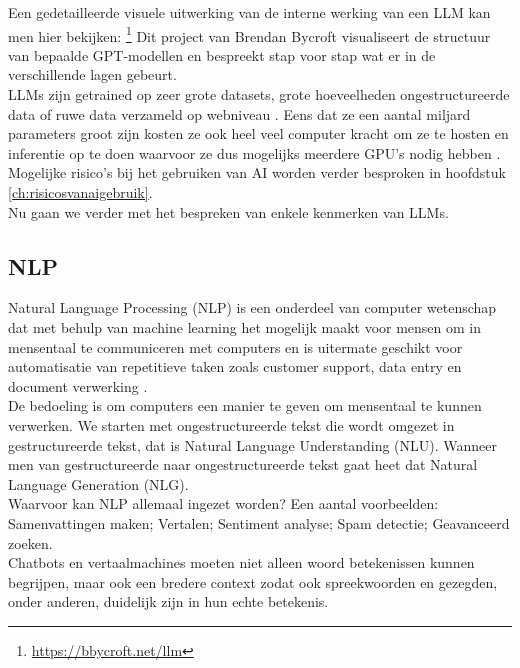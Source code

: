 Een gedetailleerde visuele uitwerking van de interne werking van een LLM kan men hier bekijken: \footnote{\href{https://bbycroft.net/llm}{https://bbycroft.net/llm}}
Dit project van Brendan Bycroft visualiseert de structuur van bepaalde GPT-modellen en bespreekt stap voor stap wat er in de verschillende lagen gebeurt. \\

LLMs zijn getrained op zeer grote datasets, grote hoeveelheden ongestructureerde data of ruwe data verzameld op webniveau \autocite{Bommasani2021}. Eens dat ze een aantal miljard parameters groot zijn kosten ze ook heel veel computer kracht om ze te hosten en inferentie op te doen waarvoor ze dus mogelijks meerdere GPU's nodig hebben \autocite{IBM2026}. Mogelijke risico's bij het gebruiken van AI worden verder besproken in hoofdstuk \ref{ch:risicosvanaigebruik}. \\

Nu gaan we verder met het bespreken van enkele kenmerken van LLMs.

\subsection{NLP}
\label{ssec:nlp}
Natural Language Processing (NLP) is een onderdeel van computer wetenschap dat met behulp van machine learning het mogelijk maakt voor mensen om in mensentaal te communiceren met computers en is uitermate geschikt voor automatisatie van repetitieve taken zoals customer support, data entry en document verwerking \autocite{IBMb}. \\

De bedoeling is om computers een manier te geven om mensentaal te kunnen verwerken. We starten met ongestructureerde tekst die wordt omgezet in gestructureerde tekst, dat is Natural Language Understanding (NLU). Wanneer men van gestructureerde naar ongestructureerde tekst gaat heet dat Natural Language Generation (NLG). \\

Waarvoor kan NLP allemaal ingezet worden? Een aantal voorbeelden: Samenvattingen maken; Vertalen; Sentiment analyse; Spam detectie; Geavanceerd zoeken. \\

Chatbots en vertaalmachines moeten niet alleen woord betekenissen kunnen begrijpen, maar ook een bredere context zodat ook spreekwoorden en gezegden, onder anderen, duidelijk zijn in hun echte betekenis. \\

